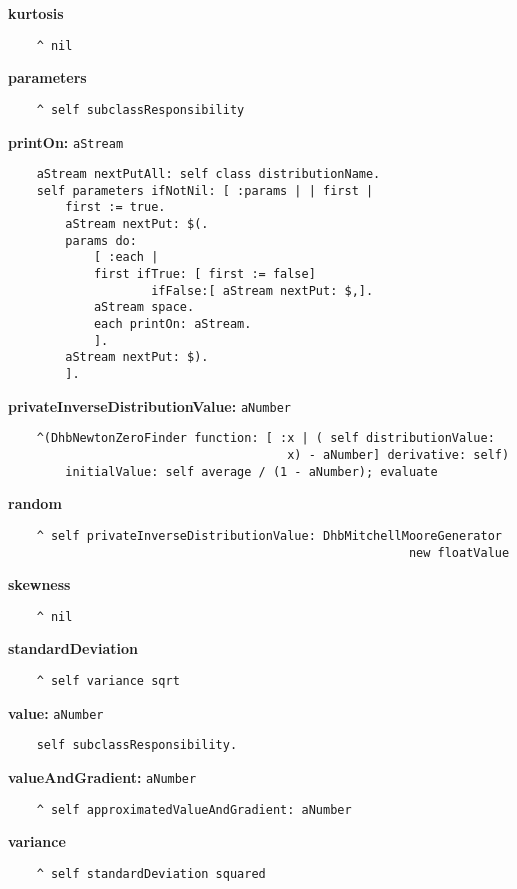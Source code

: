 {\bf kurtosis}
\begin{verbatim}
    ^ nil
\end{verbatim}
{\bf parameters}
\begin{verbatim}
    ^ self subclassResponsibility
\end{verbatim}
{\bf printOn:} {\tt aStream}
\begin{verbatim}
    aStream nextPutAll: self class distributionName.
    self parameters ifNotNil: [ :params | | first |
        first := true.
        aStream nextPut: $(.
        params do:
            [ :each |
            first ifTrue: [ first := false]
                    ifFalse:[ aStream nextPut: $,].
            aStream space.
            each printOn: aStream.
            ].
        aStream nextPut: $).
        ].
\end{verbatim}
{\bf privateInverseDistributionValue:} {\tt aNumber}
\begin{verbatim}
    ^(DhbNewtonZeroFinder function: [ :x | ( self distributionValue: 
                                       x) - aNumber] derivative: self)
        initialValue: self average / (1 - aNumber); evaluate
\end{verbatim}
{\bf random}
\begin{verbatim}
    ^ self privateInverseDistributionValue: DhbMitchellMooreGenerator 
                                                        new floatValue
\end{verbatim}
{\bf skewness}
\begin{verbatim}
    ^ nil
\end{verbatim}
{\bf standardDeviation}
\begin{verbatim}
    ^ self variance sqrt
\end{verbatim}
{\bf value:} {\tt aNumber}
\begin{verbatim}
    self subclassResponsibility.
\end{verbatim}
{\bf valueAndGradient:} {\tt aNumber}
\begin{verbatim}
    ^ self approximatedValueAndGradient: aNumber
\end{verbatim}
{\bf variance}
\begin{verbatim}
    ^ self standardDeviation squared
\end{verbatim}

